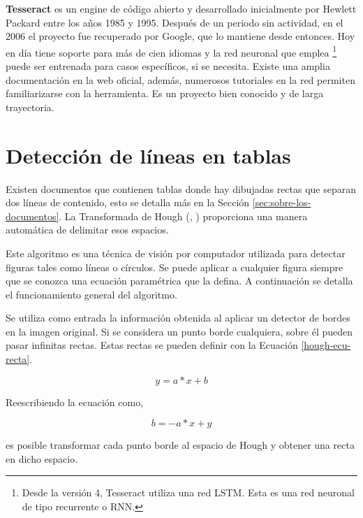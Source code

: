 \textbf{Tesseract} \cite{ocr_tesseract_smith_paper} es un engine de código abierto y desarrollado inicialmente por Hewlett Packard \cite{ocr_tesseract_v4_release_notes} entre los años 1985 y 1995. Después de un periodo sin actividad, en el 2006 el proyecto fue recuperado por Google, que lo mantiene desde entonces. Hoy en día tiene soporte para más de cien idiomas y la red neuronal que emplea \footnote{Desde la versión 4, Tesseract utiliza una red LSTM. Esta es una red neuronal de tipo recurrente o RNN.} puede ser entrenada para casos específicos, si se necesita. Existe una amplia documentación en la web oficial, además, numerosos tutoriales en la red permiten familiarizarse con la herramienta. Es un proyecto bien conocido y de larga trayectoria.

\section{Detección de líneas en tablas}

Existen documentos que contienen tablas donde hay dibujadas rectas que separan dos líneas de contenido, esto se detalla más en la Sección \ref{sec:sobre-los-documentos}. La Transformada de Hough (\cite{hough_krishna_computerVision}, \cite{hough_grauman_presentation}) proporciona una manera automática de delimitar esos espacios.

Este algoritmo es una técnica de visión por computador utilizada para detectar figuras tales como líneas o círculos. Se puede aplicar a cualquier figura siempre que se conozca una ecuación paramétrica que la defina. A continuación se detalla el funcionamiento general del algoritmo.

Se utiliza como entrada la información obtenida al aplicar un detector de bordes en la imagen original. Si se considera un punto borde cualquiera, sobre él pueden pasar infinitas rectas. Estas rectas se pueden definir con la Ecuación \ref{hough-ecu-recta}.

\begin{equation}
    \label{hough-ecu-recta}
    y = a*x + b
\end{equation}

Reescribiendo la ecuación como,

\begin{equation}
b = -a*x + y
\end{equation}

es posible transformar cada punto borde al espacio de Hough y obtener una recta en dicho espacio.

